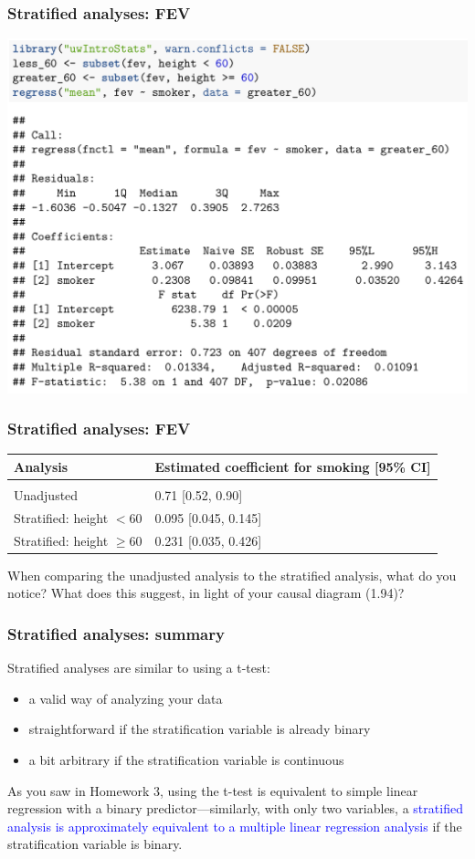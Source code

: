 \documentclass[12pt, 
hyperref={colorlinks=true, linkcolor=blue, urlcolor=cyan}]{beamer}
\begin{document}
\begin{frame}
\frametitle{Stratified analyses: FEV}

\includegraphics[width=1\textwidth]{plots/fev_vs_smoke_stratified_greater_60.png}

\end{frame}

\begin{frame}
\frametitle{Stratified analyses: FEV}
\vspace{-1cm}\hspace*{-0.75cm}\begin{tabular}{ll}
Analysis & Estimated coefficient for smoking [95\% CI] \\
\hline \\
Unadjusted  & 0.71 [0.52, 0.90]\\
Stratified: height $< 60$ & 0.095 [0.045, 0.145]\\
Stratified: height $\geq 60$ & 0.231 [0.035, 0.426]
\end{tabular}

\vspace{1cm}
When comparing the unadjusted analysis to the stratified analysis, what do you notice? What does this suggest, in light of your causal diagram (1.94)?
\end{frame}

\begin{frame}
\frametitle{Stratified analyses: summary}
Stratified analyses are similar to using a t-test:
\begin{itemize}
\item a valid way of analyzing your data
\item straightforward if the stratification variable is already binary
\item a bit arbitrary if the stratification variable is continuous
\end{itemize}

As you saw in Homework 3, using the t-test is equivalent to simple linear regression with a binary predictor---similarly, with only two variables, a \textcolor{blue}{stratified analysis is approximately equivalent to a multiple linear regression analysis} if the stratification variable is binary. 
\end{frame}
\end{document}
